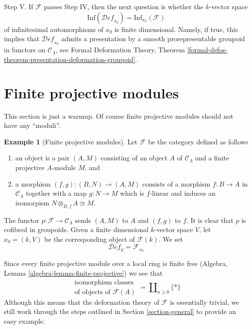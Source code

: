 \documentclass{stacks-project}
\theoremstyle{plain}
\theoremstyle{definition}
\newtheorem{example}[subsection]{Example}
\theoremstyle{remark}
\numberwithin{equation}{subsection}
\def\Deformationcategory{\mathcal{D}\!\mathit{ef}}
\begin{document}
\medskip\noindent
Step V. If $\mathcal{F}$ passes Step IV, then the next question is whether
the $k$-vector space
$$
\text{Inf}(\Deformationcategory_{x_0}) = \text{Inf}_{x_0}(\mathcal{F})
$$
of infinitesimal automorphisms of $x_0$ is finite dimensional.
Namely, if true, this implies that
$\Deformationcategory_{x_0}$ admits a presentation by a
smooth prorepresentable groupoid in functors on $\mathcal{C}_\Lambda$, see
Formal Deformation Theory, Theorem
\ref{formal-defos-theorem-presentation-deformation-groupoid}.




\section{Finite projective modules}
\label{section-finite-projective-modules}

\noindent
This section is just a warmup. Of course finite projective modules
should not have any ``moduli''.

\begin{example}[Finite projective modules]
\label{example-finite-projective-modules}
Let $\mathcal{F}$ be the category defined as follows
\begin{enumerate}
\item an object is a pair $(A, M)$ consisting of an
object $A$ of $\mathcal{C}_\Lambda$ and a
finite projective $A$-module $M$, and
\item a morphism $(f, g) : (B, N) \to (A, M)$ consists of
a morphism $f : B \to A$ in $\mathcal{C}_\Lambda$ together
with a map $g : N \to M$ which is $f$-linear and induces
an isomorpism $N \otimes_{B, f} A \cong M$.
\end{enumerate}
The functor $p : \mathcal{F} \to \mathcal{C}_\Lambda$ sends $(A, M)$ to $A$
and $(f, g)$ to $f$. It is clear that $p$ is cofibred in groupoids.
Given a finite dimensional $k$-vector space $V$,
let $x_0 = (k, V)$ be the corresponding object of $\mathcal{F}(k)$.
We set
$$
\Deformationcategory_V = \mathcal{F}_{x_0}
$$
\end{example}

\noindent
Since every finite projective module over a local ring is finite free
(Algebra, Lemma \ref{algebra-lemma-finite-projective})
we see that
$$
\begin{matrix}
\text{isomorphism classes} \\
\text{of objects of }\mathcal{F}(A)
\end{matrix}
= \coprod\nolimits_{n \geq 0} \{*\}
$$
Although this means that the deformation theory of $\mathcal{F}$
is essentially trivial, we still work through the steps outlined
in Section \ref{section-general} to provide an easy example.
\end{document}
